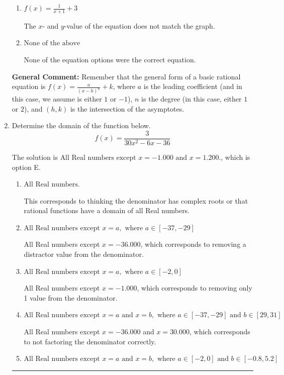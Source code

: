 \documentclass{extbook}[14pt]
\newcommand{\litem}[1]{\item #1

\rule{\textwidth}{0.4pt}}
\begin{document}
\begin{enumerate}
{\begin{enumerate}[label=\Alph*.]
Corresponds to thinking the graph was a shifted version of $\frac{1}{x^2}$, using the general form $f(x) = \frac{a}{x-h}+k$, the opposite leading coefficient, AND not noticing the $y$-value was wrong.
\item \( f(x) = \frac{1}{x + 1} + 3 \)

The $x$- and $y$-value of the equation does not match the graph.
\item \( \text{None of the above} \)

None of the equation options were the correct equation.
\end{enumerate}

\textbf{General Comment:} Remember that the general form of a basic rational equation is $ f(x) = \frac{a}{(x-h)^n} + k$, where $a$ is the leading coefficient (and in this case, we assume is either $1$ or $-1$), $n$ is the degree (in this case, either $1$ or $2$), and $(h, k)$ is the intersection of the asymptotes.
}
\litem{
Determine the domain of the function below.
\[ f(x) = \frac{3}{30x^{2} -6 x -36} \]

The solution is \( \text{All Real numbers except } x = -1.000 \text{ and } x = 1.200. \), which is option E.\begin{enumerate}[label=\Alph*.]
\item \( \text{All Real numbers.} \)

This corresponds to thinking the denominator has complex roots or that rational functions have a domain of all Real numbers.
\item \( \text{All Real numbers except } x = a, \text{ where } a \in [-37, -29] \)

All Real numbers except $x = -36.000$, which corresponds to removing a distractor value from the denominator.
\item \( \text{All Real numbers except } x = a, \text{ where } a \in [-2, 0] \)

All Real numbers except $x = -1.000$, which corresponds to removing only 1 value from the denominator.
\item \( \text{All Real numbers except } x = a \text{ and } x = b, \text{ where } a \in [-37, -29] \text{ and } b \in [29, 31] \)

All Real numbers except $x = -36.000$ and $x = 30.000$, which corresponds to not factoring the denominator correctly.
\item \( \text{All Real numbers except } x = a \text{ and } x = b, \text{ where } a \in [-2, 0] \text{ and } b \in [-0.8, 5.2] \)


\end{enumerate}}
\end{enumerate}
\end{document}
